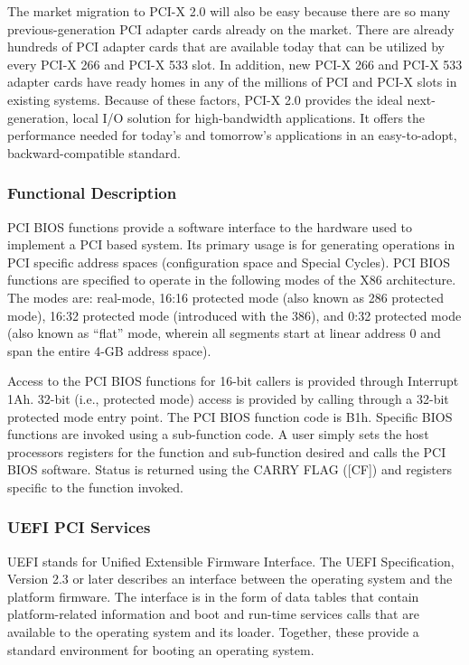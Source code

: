 The market migration to PCI-X 2.0 will also be easy because there are so many previous-generation PCI adapter cards already on the market. There are already hundreds of PCI adapter cards that are available today that can be utilized by every PCI-X 266 and PCI-X 533 slot. In addition, new PCI-X 266 and PCI-X 533 adapter cards have ready homes in any of the millions of PCI and PCI-X slots in existing systems. Because of these factors, PCI-X 2.0 provides the ideal next-generation, local I/O solution for high-bandwidth applications. It offers the performance needed for today’s and tomorrow’s applications in an easy-to-adopt, backward-compatible standard.

\subsubsection{Functional Description}
PCI BIOS functions provide a software interface to the hardware used to implement a PCI based system. Its primary usage is for generating operations in PCI specific address spaces (configuration space and Special Cycles).
PCI BIOS functions are specified to operate in the following modes of the X86 architecture. The modes are: real-mode, 16:16 protected mode (also known as 286 protected mode), 16:32 protected mode (introduced with the 386), and 0:32 protected mode (also known as “flat” mode, wherein all segments start at linear address 0 and span the entire 4-GB address space).

Access to the PCI BIOS functions for 16-bit callers is provided through Interrupt 1Ah. 32-bit (i.e., protected mode) access is provided by calling through a 32-bit protected mode entry point. The PCI BIOS function code is B1h. Specific BIOS functions are invoked using a sub-function code. A user simply sets the host processors registers for the function and sub-function desired and calls the PCI BIOS software. Status is returned using the CARRY FLAG ([CF]) and registers specific to the function invoked.

\subsubsection{UEFI PCI Services}
UEFI stands for Unified Extensible Firmware Interface. The UEFI Specification, Version 2.3 or later describes an interface between the operating system and the platform firmware. The interface is in the form of data tables that contain platform-related information and boot and run-time services calls that are available to the operating system and its loader. Together, these provide a standard environment for booting an operating system.

